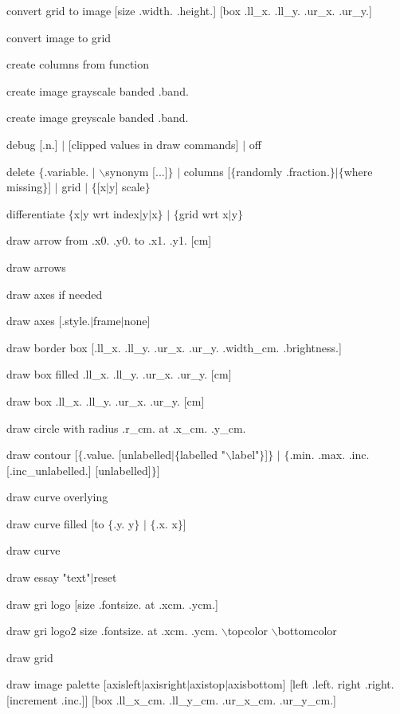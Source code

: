 convert grid to image [size .width. .height.] [box .ll\_x. .ll\_y. .ur\_x. .ur\_y.]

convert image to grid

create columns from function

create image grayscale banded .band.

create image greyscale banded .band.

debug [.n.] $\mid$ [clipped values in draw commands] $\mid$ off

delete $\lbrace$.variable. $\mid$ $\backslash$synonym [...]$\rbrace$ $\mid$ columns [$\lbrace$randomly .fraction.$\rbrace$$\mid$$\lbrace$where missing$\rbrace$] $\mid$ grid $\mid$ $\lbrace$[x$\mid$y] scale$\rbrace$

differentiate $\lbrace$x$\mid$y wrt index$\mid$y$\mid$x$\rbrace$ $\mid$ $\lbrace$grid wrt x$\mid$y$\rbrace$

draw arrow from .x0. .y0. to .x1. .y1. [cm]

draw arrows

draw axes if needed

draw axes [.style.$\mid$frame$\mid$none]

draw border box [.ll\_x. .ll\_y. .ur\_x. .ur\_y. .width\_cm. .brightness.]

draw box filled .ll\_x. .ll\_y. .ur\_x. .ur\_y. [cm]

draw box .ll\_x. .ll\_y. .ur\_x. .ur\_y. [cm]

draw circle with radius .r\_cm. at .x\_cm. .y\_cm.

draw contour [$\lbrace$.value. [unlabelled$\mid$$\lbrace$labelled "$\backslash$label"$\rbrace$]$\rbrace$ $\mid$ $\lbrace$.min. .max. .inc. [.inc\_unlabelled.] [unlabelled]$\rbrace$]

draw curve overlying

draw curve filled [to $\lbrace$.y. y$\rbrace$ $\mid$ $\lbrace$.x. x$\rbrace$]

draw curve

draw essay "text"$\mid$reset

draw gri logo [size .fontsize. at .xcm. .ycm.]

draw gri logo2 size .fontsize. at .xcm. .ycm. $\backslash$topcolor $\backslash$bottomcolor

draw grid

draw image palette [axisleft$\mid$axisright$\mid$axistop$\mid$axisbottom] [left .left. right .right. [increment .inc.]] [box .ll\_x\_cm. .ll\_y\_cm. .ur\_x\_cm. .ur\_y\_cm.]

